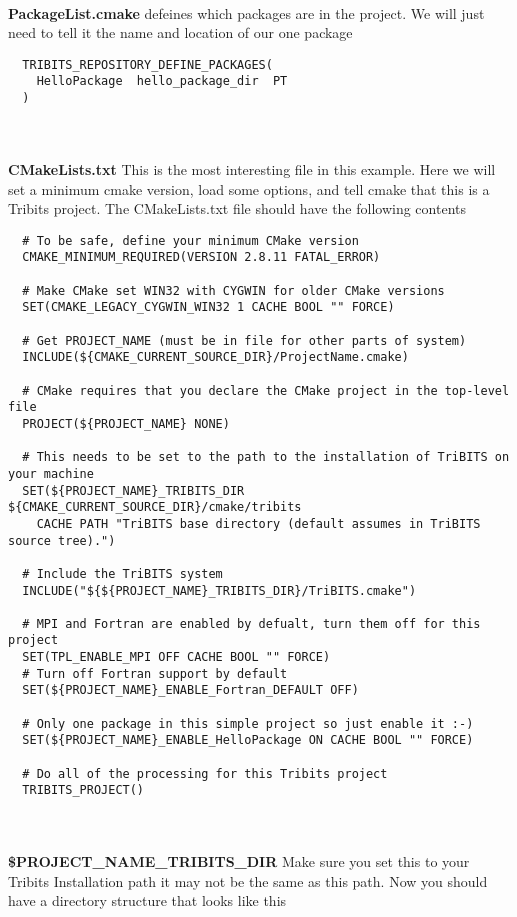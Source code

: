 \documentclass[12pt]{article}
\begin{document}
\textbf{\\PackageList.cmake} defeines which packages are in the project.  We will just need to tell it the name and location
of our one package

\begin{verbatim}
  TRIBITS_REPOSITORY_DEFINE_PACKAGES(
    HelloPackage  hello_package_dir  PT
  )
\end{verbatim}\\

\textbf{\\CMakeLists.txt} This is the most interesting file in this example.  Here we will set a minimum cmake version, load some 
options, and tell cmake that this is a Tribits project.  The CMakeLists.txt file should have the following contents

\begin{verbatim}
  # To be safe, define your minimum CMake version
  CMAKE_MINIMUM_REQUIRED(VERSION 2.8.11 FATAL_ERROR)
  
  # Make CMake set WIN32 with CYGWIN for older CMake versions
  SET(CMAKE_LEGACY_CYGWIN_WIN32 1 CACHE BOOL "" FORCE)
  
  # Get PROJECT_NAME (must be in file for other parts of system)
  INCLUDE(${CMAKE_CURRENT_SOURCE_DIR}/ProjectName.cmake)
  
  # CMake requires that you declare the CMake project in the top-level file
  PROJECT(${PROJECT_NAME} NONE)

  # This needs to be set to the path to the installation of TriBITS on your machine  
  SET(${PROJECT_NAME}_TRIBITS_DIR ${CMAKE_CURRENT_SOURCE_DIR}/cmake/tribits
    CACHE PATH "TriBITS base directory (default assumes in TriBITS source tree).")

  # Include the TriBITS system
  INCLUDE("${${PROJECT_NAME}_TRIBITS_DIR}/TriBITS.cmake")
  
  # MPI and Fortran are enabled by defualt, turn them off for this project
  SET(TPL_ENABLE_MPI OFF CACHE BOOL "" FORCE)
  # Turn off Fortran support by default
  SET(${PROJECT_NAME}_ENABLE_Fortran_DEFAULT OFF)
  
  # Only one package in this simple project so just enable it :-)
  SET(${PROJECT_NAME}_ENABLE_HelloPackage ON CACHE BOOL "" FORCE)
  
  # Do all of the processing for this Tribits project
  TRIBITS_PROJECT()
\end{verbatim}\\


\textbf{\\\${PROJECT\_NAME}\_TRIBITS\_DIR}
Make sure you set this to your Tribits Installation path it may not be the same as
this path.  Now you should have a directory structure that looks like this
\end{document}

